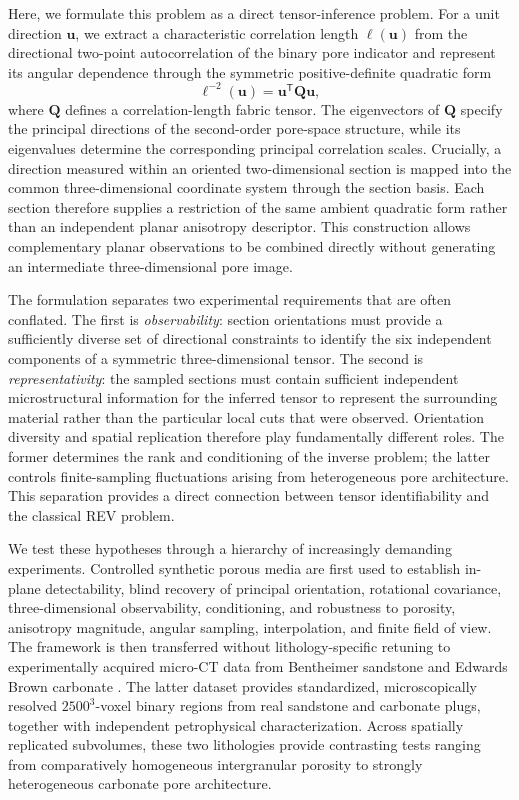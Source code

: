 \documentclass{article}
\begin{document}
Here, we formulate this problem as a direct tensor-inference problem. For a unit direction $\mathbf{u}$, we extract a characteristic correlation length $\ell(\mathbf{u})$ from the directional two-point autocorrelation of the binary pore indicator and represent its angular dependence through the symmetric positive-definite quadratic form
%
\begin{equation}
    \ell^{-2}(\mathbf{u})
    =
    \mathbf{u}^{\mathsf T}\mathbf{Q}\mathbf{u},
    \label{eq:intro_tensor}
\end{equation}
%
where $\mathbf{Q}$ defines a correlation-length fabric tensor. The eigenvectors of $\mathbf{Q}$ specify the principal directions of the second-order pore-space structure, while its eigenvalues determine the corresponding principal correlation scales. Crucially, a direction measured within an oriented two-dimensional section is mapped into the common three-dimensional coordinate system through the section basis. Each section therefore supplies a restriction of the same ambient quadratic form rather than an independent planar anisotropy descriptor. This construction allows complementary planar observations to be combined directly without generating an intermediate three-dimensional pore image.

The formulation separates two experimental requirements that are often conflated. The first is \emph{observability}: section orientations must provide a sufficiently diverse set of directional constraints to identify the six independent components of a symmetric three-dimensional tensor. The second is \emph{representativity}: the sampled sections must contain sufficient independent microstructural information for the inferred tensor to represent the surrounding material rather than the particular local cuts that were observed. Orientation diversity and spatial replication therefore play fundamentally different roles. The former determines the rank and conditioning of the inverse problem; the latter controls finite-sampling fluctuations arising from heterogeneous pore architecture. This separation provides a direct connection between tensor identifiability and the classical REV problem.

We test these hypotheses through a hierarchy of increasingly demanding experiments. Controlled synthetic porous media are first used to establish in-plane detectability, blind recovery of principal orientation, rotational covariance, three-dimensional observability, conditioning, and robustness to porosity, anisotropy magnitude, angular sampling, interpolation, and finite field of view. The framework is then transferred without lithology-specific retuning to experimentally acquired micro-CT data from Bentheimer sandstone and Edwards Brown carbonate \cite{Ferreira2023}. The latter dataset provides standardized, microscopically resolved $2500^3$-voxel binary regions from real sandstone and carbonate plugs, together with independent petrophysical characterization. Across spatially replicated subvolumes, these two lithologies provide contrasting tests ranging from comparatively homogeneous intergranular porosity to strongly heterogeneous carbonate pore architecture.
\end{document}

